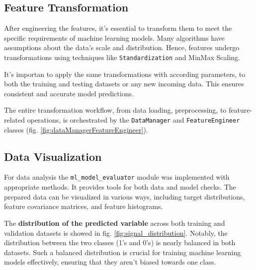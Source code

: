 \subsection{Feature Transformation}

After engineering the features, it's essential to transform them to meet the specific requirements of machine learning models. Many algorithms have assumptions about the data's scale and distribution.
Hence, features undergo transformations using techniques like \texttt{Standardization} and {MinMax Scaling}.

It's importan to apply the same transformations with according parameters, to both the training and testing datasets or any new incoming data. This ensures consistent and accurate model predictions.

The entire transformation workflow, from data loading, preprocessing, to feature-related operations, is orchestrated by the \texttt{DataManager} and \texttt{FeatureEngineer} classes (fig. \ref{fig:dataManagerFeatureEngineer}).



\subsection{Data Visualization}
For data analysis the \texttt{ml\_model\_evaluator} module was implemented with appropriate methods. It provides tools for both data and model checks.
The prepared data can be visualized in various ways, including target distributions, feature covariance matrices, and feature histograms.

The \textbf{distribution of the predicted variable} across both training and validation datasets is showed in fig. \ref{fig:signal_distribution}.
Notably, the distribution between the two classes (1's and 0's) is nearly balanced in both datasets. Such a balanced distribution is crucial for training machine learning models effectively, ensuring that they aren't biased towards one class.

